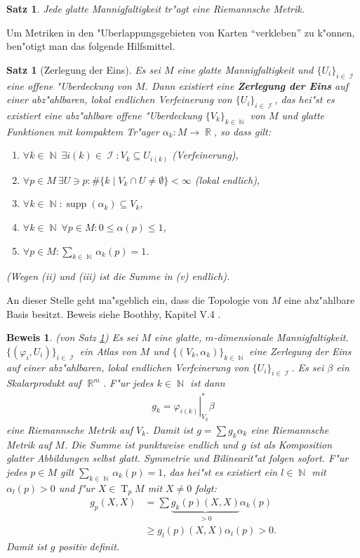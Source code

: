 \documentclass[paper=A4, twoside, chapterprefix=true, bibliography=totoc, headsepline]{scrbook}
\let\temp\phi{}
\let\phi\varphi{}
\let\varphi\temp{}
\let\temp\theta{}
\let\theta\vartheta{}
\let\vartheta\temp{}
\let\temp\epsilon{}
\let\epsilon\varepsilon{}
\let\varepsilon\temp{}
\let\temp\rho{}
\let\rho\varrho{}
\let\varrho\temp{}
\DeclareMathOperator{\N}{\mathbb{N}}
\DeclareMathOperator{\R}{\mathbb{R}}
\DeclareMathOperator{\calI}{\mathcal{I}}
\DeclareMathOperator{\supp}{supp}   %
\DeclareMathOperator{\T}{T}         %
\theoremstyle{plain}
\newtheorem{Satz}[Dfn]{Satz}
\theoremstyle{nonumberplain}
\newtheorem{satz}{Satz}
\newtheorem{bew}{Beweis}
\theoremstyle{empty}
\theoremstyle{break}
\newcommand{\CmIndex}[2][]{\ifthenelse{\isempty{#1}}{\index{#2}}{\index{#1}}#2}
\newcommand{\CmMark}[2][]{\textbf{\CmIndex[#1]{#2}}}
\begin{document}
\begin{Satz}\label{Satz-6-3}
  Jede glatte Mannigfaltigkeit tr"agt eine Riemannsche Metrik.
\end{Satz}

Um Metriken in den "Uberlappungsgebieten von Karten "`verkleben"' zu k"onnen, ben"otigt man das folgende Hilfsmittel.

\begin{satz}[Zerlegung der Eins]
  Es sei $M$ eine glatte Mannigfaltigkeit und $\{U_i\}_{i \in \calI}$ eine offene "Uberdeckung von $M$.
  Dann existiert eine \CmMark{Zerlegung der Eins} auf einer abz"ahlbaren, lokal endlichen Verfeinerung von $\{U_i\}_{i \in \calI}$, das hei"st es existiert eine abz"ahlbare offene "Uberdeckung $\{V_k\}_{k\in\N}$ von $M$ und glatte Funktionen mit kompaktem Tr"ager $\alpha_k \colon M \to \R$, so dass gilt:

  \begin{enumerate}[label=(\roman*)]
  \item $\forall k \in \N \ \exists i(k) \in \calI: V_k \subseteq U_{i(k)}$ (Verfeinerung),
  \item $\forall p \in M \ \exists U \ni p: \# \{k \mid V_k \cap U \neq \emptyset \} < \infty$ (lokal endlich),
  \item $\forall k \in \N: \supp (\alpha_k) \subseteq V_k$,
  \item $\forall k \in \N \ \forall p \in M: 0 \leq \alpha(p) \leq 1$,
  \item $\forall p \in M: \sum_{k\in\N}\alpha_k(p) = 1$.
  \end{enumerate}
  (Wegen (ii) und (iii) ist die Summe in (v) endlich).
\end{satz}
An dieser Stelle geht ma"sgeblich ein, dass die Topologie von $M$ eine abz"ahlbare Basis besitzt. Beweis siehe Boothby, Kapitel V.4 \cite{boothby1986introduction}.

\begin{bew}(von Satz \ref{Satz-6-3})
Es sei $M$ eine glatte, $m$-dimensionale Mannigfaltigkeit. $\{(\phi_i,U_i)\}_{i \in \calI}$ ein Atlas von $M$ und $\{(V_k,\alpha_k)\}_{k \in \N}$ eine Zerlegung der Eins auf einer abz"ahlbaren, lokal endlichen Verfeinerung von $\{U_i\}_{i \in \calI}$. Es sei $\beta$ ein Skalarprodukt auf $\R^m$. F"ur jedes $k \in \N$ ist dann
\begin{align*}
	g_k = \left.\phi_{i(k)}\right|_{V_k}^{*}\beta
\end{align*}
eine Riemannsche Metrik auf $V_k$. Damit ist $g = \sum g_k\alpha_k$ eine Riemannsche Metrik auf $M$.
Die Summe ist punktweise endlich und $g$ ist als Komposition glatter Abbildungen selbst glatt.
Symmetrie und Bilinearit"at folgen sofort.
F"ur jedes $p \in M$ gilt $\sum_{k \in \N}\alpha_k(p) = 1$, das hei"st es existiert ein $l \in \N$ mit $\alpha_l(p) > 0$ und f"ur $X \in \T_pM$ mit $X \neq 0$ folgt:
\begin{align*}
	g_p(X,X) & = \sum \underbrace{g_k(p)(X,X)}_{> 0}\alpha_k(p)\\
	& \geq g_l(p)(X,X)\alpha_l(p) > 0.
\end{align*}
Damit ist $g$ positiv definit.
\end{bew}
\end{document}
